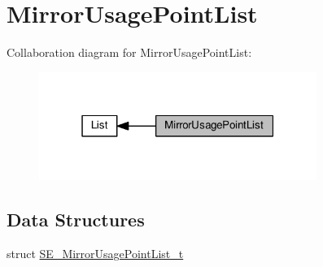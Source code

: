 \hypertarget{group__MirrorUsagePointList}{}\section{Mirror\+Usage\+Point\+List}
\label{group__MirrorUsagePointList}
Collaboration diagram for Mirror\+Usage\+Point\+List\+:\nopagebreak
\begin{figure}[H]
\begin{center}
\leavevmode
\includegraphics[width=256pt]{group__MirrorUsagePointList}
\end{center}
\end{figure}
\subsection*{Data Structures}
\begin{DoxyCompactItemize}
\item 
struct \hyperlink{structSE__MirrorUsagePointList__t}{S\+E\+\_\+\+Mirror\+Usage\+Point\+List\+\_\+t}
\end{DoxyCompactItemize}
